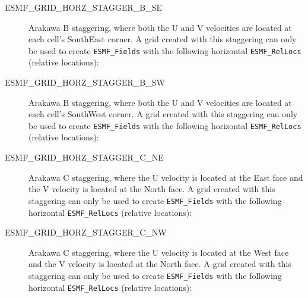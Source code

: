 \begin{description}
    \item [ESMF\_GRID\_HORZ\_STAGGER\_B\_SE]
          Arakawa B staggering, where both the U and V velocities are located at
          each cell's SouthEast corner.  A grid created with this staggering can
          only be used to create {\tt ESMF\_Fields} with the following
          horizontal {\tt ESMF\_RelLocs} (relative locations):

    \item [ESMF\_GRID\_HORZ\_STAGGER\_B\_SW]
          Arakawa B staggering, where both the U and V velocities are located at
          each cell's SouthWest corner.  A grid created with this staggering can
          only be used to create {\tt ESMF\_Fields} with the following
          horizontal {\tt ESMF\_RelLocs} (relative locations):

    \item [ESMF\_GRID\_HORZ\_STAGGER\_C\_NE]
          Arakawa C staggering, where the U velocity is located at the East face
          and the V velocity is located at the North face.  A grid created with
          this staggering can only be used to create {\tt ESMF\_Fields} with the
          following horizontal {\tt ESMF\_RelLocs} (relative locations):

    \item [ESMF\_GRID\_HORZ\_STAGGER\_C\_NW]
          Arakawa C staggering, where the U velocity is located at the West face
          and the V velocity is located at the North face.  A grid created with
          this staggering can only be used to create {\tt ESMF\_Fields} with the
          following horizontal {\tt ESMF\_RelLocs} (relative locations):
 

\end{description}
